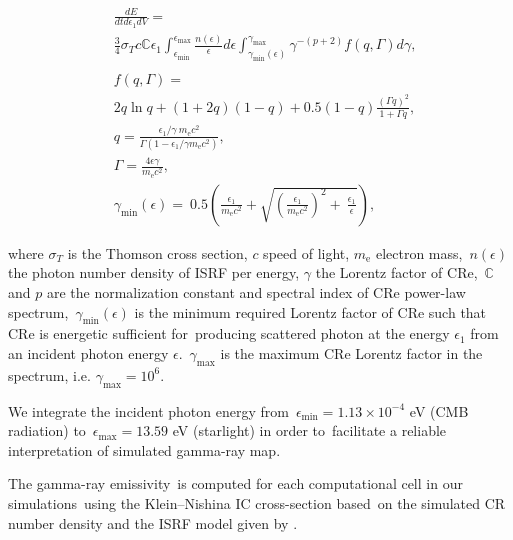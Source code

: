 \documentclass[twocolumn]{aastex631}
\begin{document}
\begin{subequations}
  \begin{align}
  &\frac{dE}{dtd\epsilon_{1}dV} =\nonumber\\
               &\frac{3}{4}\sigma_{T}c\mathbb{C}\epsilon_{1}\int^{\epsilon_{\text{max}}}_{\epsilon_{\text{min}}}
               \frac{n(\epsilon)}{\epsilon}d\epsilon\int^{\gamma_{\text{max}}}_{\gamma_{\text{min}}\left(\epsilon\right)}
               \gamma^{-(p+2)}f(q, \Gamma)d\gamma,\\
  \nonumber\\
  &f(q, \Gamma) =\nonumber\\
               &2q\ln q+(1+2q)(1-q)+0.5(1-q)\frac{\left(\Gamma q\right)^2}{1+\Gamma q},\\
  &q=\frac{\epsilon_{1}/\gamma\
               m_{\text{e}}c^{2}}{\Gamma\left(1-\epsilon_{1}/\gamma m_{\text{e}}c^{2}\right)},\\
  &\Gamma=\frac{4\epsilon \gamma}{m_{\text{e}}c^2},\\
  &\gamma_{\text{min}}(\epsilon)=\
   0.5\left(\frac{\epsilon_{1}}{m_{\text{e}}c^2}+\sqrt{\left(\frac{\epsilon_{1}}{m_{\text{e}}c^2}\right)^2+\
   \frac{\epsilon_{1}}{\epsilon}}\right),
  \end{align}
\end{subequations}

where $\sigma_{T}$ is the Thomson cross section, $c$ speed of light, $m_{\text{e}}$ electron mass,\
$n(\epsilon)$ the photon number density of ISRF per energy, $\gamma$ the Lorentz factor of CRe,\
$\mathbb{C}$ and $p$ are the normalization constant and spectral index of CRe power-law spectrum,\
$\gamma_{\text{min}}(\epsilon)$ is the minimum required Lorentz factor of CRe such that CRe is energetic sufficient for\
producing scattered photon at the energy $\epsilon_{1}$ from an incident photon energy $\epsilon$.\
$\gamma_{\text{max}}$ is the maximum CRe Lorentz factor in the spectrum, i.e. $\gamma_{\text{max}}=10^{6}$.


We integrate the incident photon energy from\
$\epsilon_{\text{min}}=1.13\times10^{-4}$ eV (CMB radiation) to\
$\epsilon_{\text{max}}=13.59$ eV (starlight) in order to\
facilitate a reliable interpretation of simulated gamma-ray map.


The gamma-ray emissivity\
is computed for each computational cell in our simulations\
using the Klein–Nishina IC cross-section \citep{Jones1968} based\
on the simulated CR number density and the ISRF model given by \citet{Porter2017}.
\end{document}
